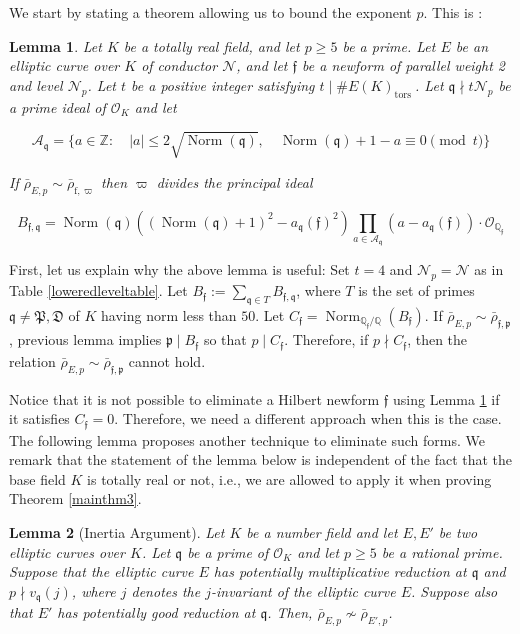 \documentclass[]{article}
\newtheorem{lemma}{Lemma}
\newcommand {\QQ}{{\mathbb{Q}}}
\newcommand {\mcalO}{{\mathcal{O}}}
\newcommand {\mfp}{{\mathfrak{P}}}
\DeclareMathOperator{\Norm}{Norm}
\begin{document}
    We start by stating a theorem allowing us to bound the exponent $p$. This is \cite[Lemma 7.1]{freitas2015fermat}:
    \begin{lemma}\label{C_f}
      Let $K$ be a totally real field, and let $p \geq 5$ be a prime. Let $E$ be an elliptic curve over $K$ of conductor $\mathcal{N}$, and let $\mathfrak{f}$ be a newform of parallel weight 2 and level $\mathcal{N}_p$. Let $t$ be a positive integer satisfying $t \mid \# E(K)_{\text {tors }}$. Let $\mathfrak{q} \nmid t \mathcal{N}_p$ be a prime ideal of $\mathcal{O}_K$ and let

$$
\mathcal{A}_{\mathfrak{q}}=\{a \in \mathbb{Z}: \quad|a| \leq 2 \sqrt{\operatorname{Norm}(\mathfrak{q})}, \quad \operatorname{Norm}(\mathfrak{q})+1-a \equiv 0 \pmod{t}\}
$$


If $\bar{\rho}_{E, p} \sim \bar{\rho}_{\mathrm{f}, \varpi}$ then $\varpi$ divides the principal ideal

$$
B_{\mathfrak{f}, \mathfrak{q}}=\operatorname{Norm}(\mathfrak{q})\left((\operatorname{Norm}(\mathfrak{q})+1)^2-a_{\mathfrak{q}}(\mathfrak{f})^2\right) \prod_{a \in \mathcal{A}_{\mathfrak{q}}}\left(a-a_{\mathfrak{q}}(\mathfrak{f})\right) \cdot \mathcal{O}_{\mathbb{Q}_{\mathfrak{f}}}
$$

    \end{lemma}
First, let us explain why the above lemma is useful: Set $t=4$ and $\mathcal{N}_p=\mathcal{N}$ as in Table \ref{loweredleveltable}. Let $B_{\mathfrak{f}}:=\sum_{\mathfrak{q} \in T} B_{\mathfrak{f}, \mathfrak{q}}$, where $T$ is the set of primes $\mathfrak{q}\ne \mfp,\mathfrak{D}$ of $K$ having norm less than $50$. Let $C_{\mathfrak{f}}=\Norm_{\QQ_\mathfrak{f}/\QQ}(B_{\mathfrak{f}})$. If $\bar{\rho}_{E, p} \sim \bar{\rho}_{\mathfrak{f}, \mathfrak{p}}$, previous lemma implies $\mathfrak{p}\mid B_{\mathfrak{f}}$ so that $p\mid C_{\mathfrak{f}}$. Therefore, if $p\nmid C_{\mathfrak{f}}$, then the relation $\bar{\rho}_{E, p} \sim \bar{\rho}_{\mathfrak{f}, \mathfrak{p}}$ cannot hold. 

Notice that it is not possible to eliminate a Hilbert newform $\mathfrak{f}$ using Lemma \ref{C_f} if it satisfies $C_\mathfrak{f}=0$. Therefore, we need a different approach when this is the case. The following lemma proposes another technique to eliminate such forms. We remark that the statement of the lemma below is independent of the fact that the base field $K$ is totally real or not, i.e., we are allowed to apply it when proving Theorem \ref{mainthm3}.

\begin{lemma}[Inertia Argument]\label{lemma:imageofinertia}
Let $K$ be a number field and let $E,E'$ be two elliptic curves over $K$. Let $\mathfrak{q}$ be a prime of $\mcalO_K$ and let $p\ge5$ be a rational prime. Suppose that the elliptic curve $E$ has potentially multiplicative reduction at $\mathfrak{q}$ and $p\nmid v_{\mathfrak{q}}(j)$, where $j$ denotes the $j$-invariant of the elliptic curve $E$. Suppose also that $E'$ has potentially good reduction at $\mathfrak{q}$. Then, $\bar{\rho}_{E, p} \not\sim \bar{\rho}_{E', p}$.
\end{lemma}
\end{document}
